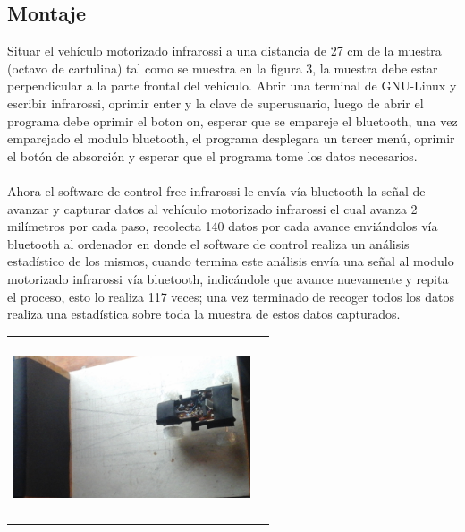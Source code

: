 \documentclass[12]{article}
\newenvironment{Figure}
{\par\medskip\noindent\minipage{\linewidth}}
{\endminipage\par\medskip}
\begin{document}
\begin{multicols}{2}
\subsection{Montaje}
Situar el vehículo motorizado infrarossi a una distancia de 27 cm de la muestra (octavo de cartulina) tal como se muestra en la figura 3, la muestra debe estar perpendicular a la parte frontal del vehículo. Abrir una terminal de GNU-Linux y escribir infrarossi, oprimir enter y la clave de superusuario, luego de abrir el programa debe oprimir el boton on, esperar que se empareje el bluetooth, una vez emparejado el modulo bluetooth, el programa desplegara un tercer menú, oprimir el botón de absorción y esperar que el programa tome los datos necesarios.\\\\
Ahora el software de control free infrarossi le envía vía bluetooth la señal de avanzar y capturar datos al vehículo motorizado infrarossi el cual avanza 2 milímetros por cada paso, recolecta 140 datos por cada avance enviándolos vía bluetooth al ordenador en donde el software de control realiza un análisis estadístico de los mismos, cuando termina este análisis envía una señal al modulo motorizado infrarossi vía bluetooth, indicándole que avance nuevamente y repita el proceso, esto lo realiza 117 veces; una vez terminado de recoger todos los datos realiza una estadística sobre toda la muestra de estos datos capturados. 
\begin{Figure}	
\center
\begin{tabular}{|l|r|}
\hline \\
\includegraphics[width=7cm, height=5cm]{img/mon_abso.png} \\\\ \hline
\end{tabular}
\label{fig:g3}
\end{Figure}
\vspace{0.2cm}

\end{multicols}
\end{document}
